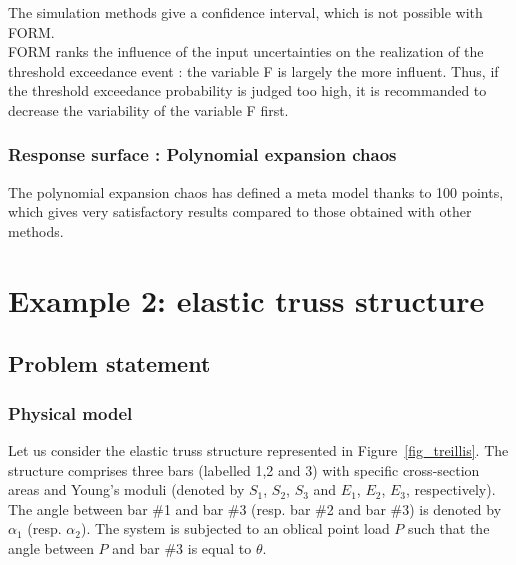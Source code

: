 \documentclass[11pt]{article}
\begin{document}
The simulation methods give a confidence interval, which is not possible with FORM.\\

FORM ranks the influence of the input uncertainties on the realization of the threshold exceedance event : the variable F is largely the more influent. Thus, if the threshold exceedance probability is judged too high, it is recommanded to decrease the variability of the variable F first.


\subsubsection{Response surface : Polynomial expansion chaos}

The polynomial expansion chaos has defined a meta model thanks to 100 points, which gives very satisfactory results compared to those obtained with other methods.




\newpage
\section{Example 2: elastic truss structure}

\subsection{Problem statement}

\subsubsection{Physical model}

Let us consider the elastic truss structure represented in Figure~\ref{fig_treillis}. The structure comprises three bars (labelled 1,2 and 3) with specific cross-section areas and Young's moduli (denoted by $S_1$, $S_2$, $S_3$ and $E_1$, $E_2$, $E_3$, respectively). The angle between bar \#1 and bar \#3 (resp. bar \#2 and bar \#3) is denoted by $\alpha_1$ (resp. $\alpha_2$). The system is subjected to an oblical point load $P$ such that the angle between $P$ and bar \#3 is equal to $\theta$.  
\end{document}
